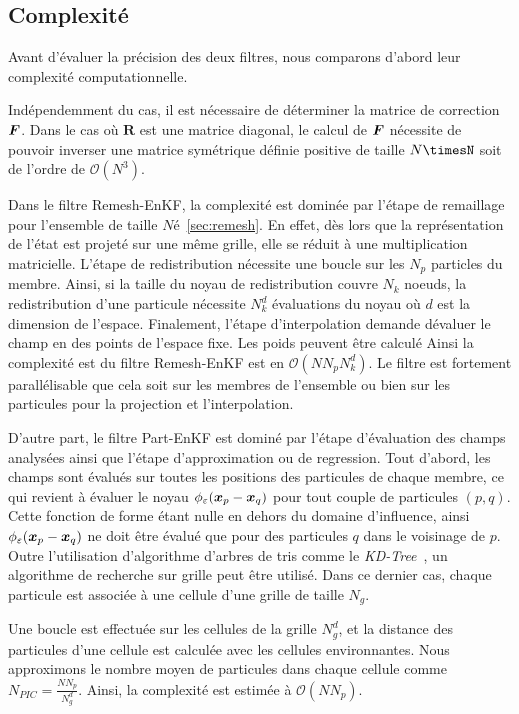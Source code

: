 \begin{itemize}
\subsection{Complexité}

Avant d'évaluer la précision des deux filtres, nous comparons d'abord leur complexité computationnelle.

Indépendemment du cas, il est nécessaire de déterminer la matrice de correction $\bm{F}$. Dans le cas où $\bm R$ est une matrice diagonal, le calcul de $\bm{F}$ nécessite de pouvoir inverser une matrice symétrique définie positive de taille $N\timesN$ soit de l'ordre de $\mathcal O (N^3)$.

Dans le filtre Remesh-EnKF, la complexité est dominée par l'étape de remaillage pour l'ensemble de taille $N$é~\ref{sec:remesh}. En effet, dès lors que la représentation de l'état est projeté sur une même grille, elle se réduit à une multiplication matricielle.
L'étape de redistribution nécessite une boucle sur les $N_p$ particles du membre. Ainsi, si la taille du noyau de redistribution couvre $N_k$ noeuds, la redistribution d'une particule nécessite $N_k^d$ évaluations du noyau où $d$ est la dimension de l'espace. Finalement, l'étape d'interpolation demande dévaluer le champ en des points de l'espace fixe. Les poids peuvent être calculé Ainsi la complexité est du filtre Remesh-EnKF est en $\mathcal{O} (NN_pN_k^d)$. Le filtre est fortement parallélisable que cela soit sur les membres de l'ensemble ou bien sur les particules pour la projection et l'interpolation.

D'autre part, le filtre Part-EnKF est dominé par l'étape d'évaluation des champs analysées ainsi que l'étape d'approximation ou de regression. Tout d'abord, les champs sont évalués sur toutes les positions des particules de chaque membre, ce qui revient à évaluer le noyau $\phi_\varepsilon(\bm{x}_p -\bm{x}_q)$ pour tout couple de particules $(p, q)$. Cette fonction de forme étant nulle en dehors du domaine d'influence, ainsi $\phi_\varepsilon(\bm{x}_p -\bm{x}_q)$ ne doit être évalué que pour des particules $q$ dans le voisinage de $p$. Outre l'utilisation d'algorithme d'arbres de tris comme le \textit{KD-Tree}~\cite{bentley_1975_kdtree}, un algorithme de recherche sur grille peut être utilisé. Dans ce dernier cas, chaque particule est associée à une cellule d'une grille de taille $N_g$.

Une boucle est effectuée sur les cellules de la grille $N_g^d$, et la distance des particules d'une cellule est calculée avec les cellules environnantes. Nous approximons le nombre moyen de particules dans chaque cellule comme $N_{PIC} = \frac{NN_p}{N_g^d}$. Ainsi, la complexité est estimée à $\mathcal{O}(NN_p)$.


\end{itemize}
